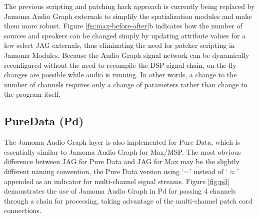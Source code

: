\documentclass[twoside,a4paper]{article}
\begin{document}
The previous scripting and patching hack approach is currently being replaced by Jamoma Audio Graph externals to simplify the spatialization modules and make them more robust.
Figure \ref{fig:max-before-after}b indicates how the number of sources and speakers can be changed simply by updating attribute values for a few select JAG externals, thus eliminating the need for patcher scripting in Jamoma Modules.
Because the Audio Graph signal network can be dynamically reconfigured without the need to recompile the DSP signal chain, on-the-fly changes are possible while audio is running.  In other words, a change to the number of channels requires only a change of parameters rather than change to the program itself.





\subsection{PureData (Pd)} %

The Jamoma Audio Graph layer is also implemented for Pure Data, which is essentially similar to Jamoma Audio Graph for Max/MSP. 
The most obvious difference between JAG for Pure Data and JAG for Max may be the slightly different naming convention, the Pure Data version using `=' instead of `$\approx$' appended as an indicator for multi-channel signal streams. 
Figure \ref{fig:pd} demonstrates the use of Jamoma Audio Graph in Pd for passing 4 channels through a chain for processing, taking advantage of the multi-channel patch cord connections.  
\end{document}
